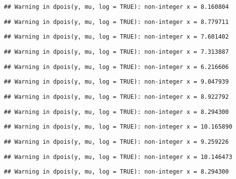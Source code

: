 \documentclass[
]{article}
\begin{document}
\begin{verbatim}
## Warning in dpois(y, mu, log = TRUE): non-integer x = 8.160804
\end{verbatim}

\begin{verbatim}
## Warning in dpois(y, mu, log = TRUE): non-integer x = 8.779711
\end{verbatim}

\begin{verbatim}
## Warning in dpois(y, mu, log = TRUE): non-integer x = 7.601402
\end{verbatim}

\begin{verbatim}
## Warning in dpois(y, mu, log = TRUE): non-integer x = 7.313887
\end{verbatim}

\begin{verbatim}
## Warning in dpois(y, mu, log = TRUE): non-integer x = 6.216606
\end{verbatim}

\begin{verbatim}
## Warning in dpois(y, mu, log = TRUE): non-integer x = 9.047939
\end{verbatim}

\begin{verbatim}
## Warning in dpois(y, mu, log = TRUE): non-integer x = 8.922792
\end{verbatim}

\begin{verbatim}
## Warning in dpois(y, mu, log = TRUE): non-integer x = 8.294300
\end{verbatim}

\begin{verbatim}
## Warning in dpois(y, mu, log = TRUE): non-integer x = 10.165890
\end{verbatim}

\begin{verbatim}
## Warning in dpois(y, mu, log = TRUE): non-integer x = 9.259226
\end{verbatim}

\begin{verbatim}
## Warning in dpois(y, mu, log = TRUE): non-integer x = 10.146473
\end{verbatim}

\begin{verbatim}
## Warning in dpois(y, mu, log = TRUE): non-integer x = 8.294300
\end{verbatim}
\end{document}
